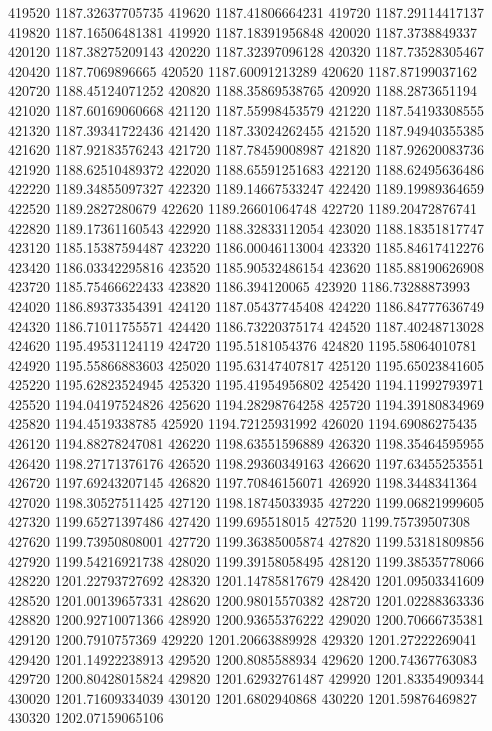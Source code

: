{419520 1187.32637705735
419620 1187.41806664231
419720 1187.29114417137
419820 1187.16506481381
419920 1187.18391956848
420020 1187.3738849337
420120 1187.38275209143
420220 1187.32397096128
420320 1187.73528305467
420420 1187.7069896665
420520 1187.60091213289
420620 1187.87199037162
420720 1188.45124071252
420820 1188.35869538765
420920 1188.2873651194
421020 1187.60169060668
421120 1187.55998453579
421220 1187.54193308555
421320 1187.39341722436
421420 1187.33024262455
421520 1187.94940355385
421620 1187.92183576243
421720 1187.78459008987
421820 1187.92620083736
421920 1188.62510489372
422020 1188.65591251683
422120 1188.62495636486
422220 1189.34855097327
422320 1189.14667533247
422420 1189.19989364659
422520 1189.2827280679
422620 1189.26601064748
422720 1189.20472876741
422820 1189.17361160543
422920 1188.32833112054
423020 1188.18351817747
423120 1185.15387594487
423220 1186.00046113004
423320 1185.84617412276
423420 1186.03342295816
423520 1185.90532486154
423620 1185.88190626908
423720 1185.75466622433
423820 1186.394120065
423920 1186.73288873993
424020 1186.89373354391
424120 1187.05437745408
424220 1186.84777636749
424320 1186.71011755571
424420 1186.73220375174
424520 1187.40248713028
424620 1195.49531124119
424720 1195.5181054376
424820 1195.58064010781
424920 1195.55866883603
425020 1195.63147407817
425120 1195.65023841605
425220 1195.62823524945
425320 1195.41954956802
425420 1194.11992793971
425520 1194.04197524826
425620 1194.28298764258
425720 1194.39180834969
425820 1194.4519338785
425920 1194.72125931992
426020 1194.69086275435
426120 1194.88278247081
426220 1198.63551596889
426320 1198.35464595955
426420 1198.27171376176
426520 1198.29360349163
426620 1197.63455253551
426720 1197.69243207145
426820 1197.70846156071
426920 1198.3448341364
427020 1198.30527511425
427120 1198.18745033935
427220 1199.06821999605
427320 1199.65271397486
427420 1199.695518015
427520 1199.75739507308
427620 1199.73950808001
427720 1199.36385005874
427820 1199.53181809856
427920 1199.54216921738
428020 1199.39158058495
428120 1199.38535778066
428220 1201.22793727692
428320 1201.14785817679
428420 1201.09503341609
428520 1201.00139657331
428620 1200.98015570382
428720 1201.02288363336
428820 1200.92710071366
428920 1200.93655376222
429020 1200.70666735381
429120 1200.7910757369
429220 1201.20663889928
429320 1201.27222269041
429420 1201.14922238913
429520 1200.8085588934
429620 1200.74367763083
429720 1200.80428015824
429820 1201.62932761487
429920 1201.83354909344
430020 1201.71609334039
430120 1201.6802940868
430220 1201.59876469827
430320 1202.07159065106
}
